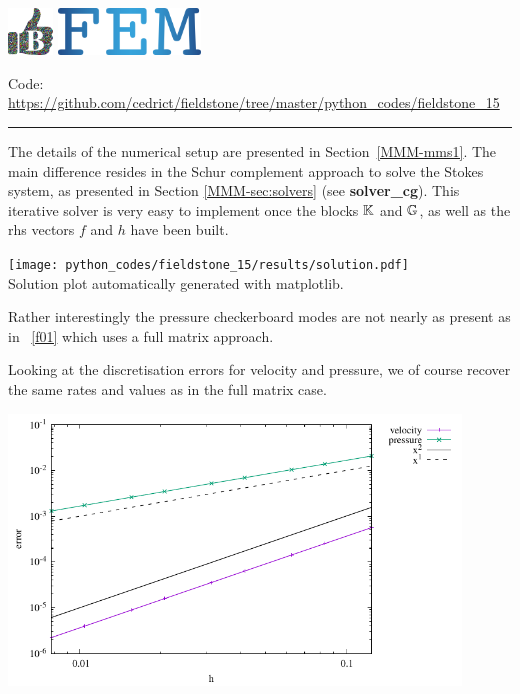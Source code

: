 \includegraphics[height=1.25cm]{images/pictograms/benchmark}
\includegraphics[height=1.25cm]{images/pictograms/FEM}




\begin{center}
\inpython
{\small Code: \url{https://github.com/cedrict/fieldstone/tree/master/python_codes/fieldstone_15}}
\end{center}

\par\noindent\rule{\textwidth}{0.4pt}

The details of the numerical setup are presented in Section~\ref{MMM-mms1}.
The main difference resides in the Schur complement approach to solve the 
Stokes system, as presented in Section \ref{MMM-sec:solvers} (see {\bf solver\_cg}).
This iterative solver is very easy to implement once the blocks ${\mathbb{K}}$ and ${\mathbb{G}}$, 
as well as the rhs vectors $f$ and $h$ have been built. 

\begin{center}
\texttt{[image: python\_codes/fieldstone\_15/results/solution.pdf]}\\
{\captionfont Solution plot automatically generated with matplotlib.}
\end{center}

Rather interestingly the pressure checkerboard modes are not nearly as present as 
in \stone~\ref{f01} which uses a full matrix approach. 

Looking at the discretisation errors for velocity and pressure, we 
of course recover the same rates and values as in the full matrix case.

\begin{center}
\includegraphics[width=12cm]{python_codes/fieldstone_15/results/errors.pdf}
\end{center}

